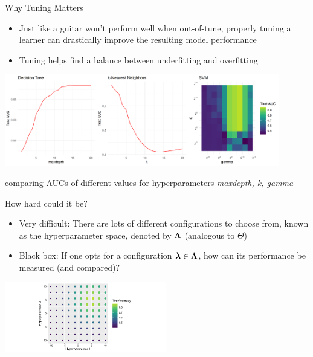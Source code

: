 \documentclass[11pt,compress,t,notes=noshow, xcolor=table]{beamer}
\begin{document}
\begin{vbframe}{Why Tuning Matters}
\begin{itemize}
\item \small Just like a guitar won't perform well when out-of-tune, properly tuning a learner can drastically improve the resulting model performance
\item \small Tuning helps find a balance between underfitting and overfitting
\end{itemize}

\begin{center}
\vspace{2em}
\includegraphics[width = 0.9\textwidth]{figure/tuning_importance.png}
\end{center}
\vspace{1em}
\begin{center}
\scriptsize comparing AUCs of different values for hyperparameters \textit{maxdepth, k, gamma}
\end{center}

\end{vbframe}



\begin{vbframe}{How hard could it be?}
\begin{itemize}
\item \small Very difficult: There are lots of different configurations to choose from, known as the hyperparameter space, denoted by $\bm{\Lambda}$ (analogous to $\Theta$)
\item \small Black box: If one opts for a configuration $\bm{\lambda} \in \bm{\Lambda}$, how can its performance be measured (and compared)?
\end{itemize}



\begin{center}
\vspace{2em}
\includegraphics[width=200pt]{figure/cart_tuning_balgos_1.pdf}
\end{center}

\end{vbframe}
\end{document}
